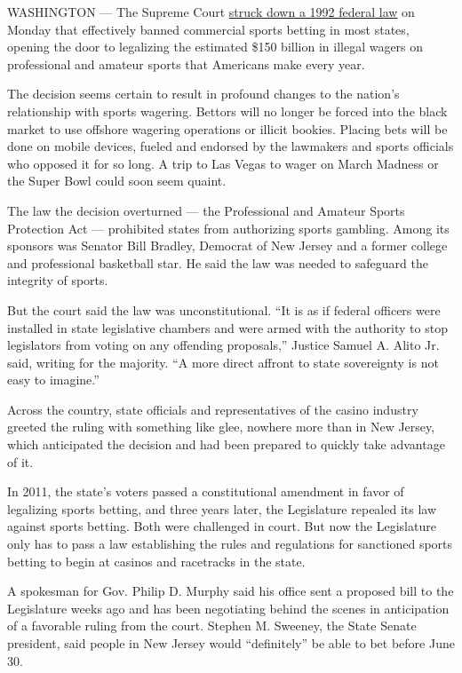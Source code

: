 WASHINGTON --- The Supreme Court
\href{https://www.supremecourt.gov/opinions/17pdf/16-476_dbfi.pdf}{struck
down a 1992 federal law} on Monday that effectively banned commercial
sports betting in most states, opening the door to legalizing the
estimated \$150 billion in illegal wagers on professional and amateur
sports that Americans make every year.

The decision seems certain to result in profound changes to the nation's
relationship with sports wagering. Bettors will no longer be forced into
the black market to use offshore wagering operations or illicit bookies.
Placing bets will be done on mobile devices, fueled and endorsed by the
lawmakers and sports officials who opposed it for so long. A trip to Las
Vegas to wager on March Madness or the Super Bowl could soon seem
quaint.

The law the decision overturned --- the Professional and Amateur Sports
Protection Act --- prohibited states from authorizing sports gambling.
Among its sponsors was Senator Bill Bradley, Democrat of New Jersey and
a former college and professional basketball star. He said the law was
needed to safeguard the integrity of sports.

But the court said the law was unconstitutional. ``It is as if federal
officers were installed in state legislative chambers and were armed
with the authority to stop legislators from voting on any offending
proposals,'' Justice Samuel A. Alito Jr. said, writing for the majority.
``A more direct affront to state sovereignty is not easy to imagine.''

Across the country, state officials and representatives of the casino
industry greeted the ruling with something like glee, nowhere more than
in New Jersey, which anticipated the decision and had been prepared to
quickly take advantage of it.

In 2011, the state's voters passed a constitutional amendment in favor
of legalizing sports betting, and three years later, the Legislature
repealed its law against sports betting. Both were challenged in court.
But now the Legislature only has to pass a law establishing the rules
and regulations for sanctioned sports betting to begin at casinos and
racetracks in the state.

A spokesman for Gov. Philip D. Murphy said his office sent a proposed
bill to the Legislature weeks ago and has been negotiating behind the
scenes in anticipation of a favorable ruling from the court. Stephen M.
Sweeney, the State Senate president, said people in New Jersey would
``definitely'' be able to bet before June 30.

